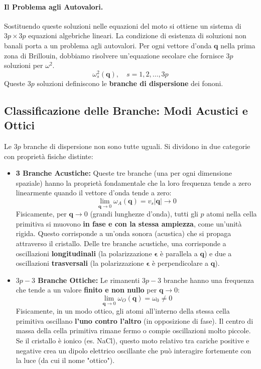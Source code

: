 \paragraph{Il Problema agli Autovalori.}
Sostituendo queste soluzioni nelle equazioni del moto si ottiene un sistema di \(3p \times 3p\) equazioni algebriche lineari. La condizione di esistenza di soluzioni non banali porta a un problema agli autovalori. Per ogni vettore d'onda \(\mathbf{q}\) nella prima zona di Brillouin, dobbiamo risolvere un'equazione secolare che fornisce \(3p\) soluzioni per \(\omega^2\).
\[ \omega^2_{s}(\mathbf{q}), \quad s=1, 2, \dots, 3p \]
Queste \(3p\) soluzioni definiscono le \textbf{branche di dispersione} dei fononi.

\subsection{Classificazione delle Branche: Modi Acustici e Ottici}
Le \(3p\) branche di dispersione non sono tutte uguali. Si dividono in due categorie con proprietà fisiche distinte:
\begin{itemize}
    \item \textbf{3 Branche Acustiche:} Queste tre branche (una per ogni dimensione spaziale) hanno la proprietà fondamentale che la loro frequenza tende a zero linearmente quando il vettore d'onda tende a zero:
    \[ \lim_{\mathbf{q} \to 0} \omega_{A}(\mathbf{q}) = v_s |\mathbf{q}| \to 0 \]
    Fisicamente, per \(\mathbf{q} \to 0\) (grandi lunghezze d'onda), tutti gli \(p\) atomi nella cella primitiva si muovono \textbf{in fase e con la stessa ampiezza}, come un'unità rigida. Questo corrisponde a un'onda sonora (acustica) che si propaga attraverso il cristallo. Delle tre branche acustiche, una corrisponde a oscillazioni \textbf{longitudinali} (la polarizzazione \(\boldsymbol{\epsilon}\) è parallela a \(\mathbf{q}\)) e due a oscillazioni \textbf{trasversali} (la polarizzazione \(\boldsymbol{\epsilon}\) è perpendicolare a \(\mathbf{q}\)).

    \item \textbf{\(3p-3\) Branche Ottiche:} Le rimanenti \(3p-3\) branche hanno una frequenza che tende a un valore \textbf{finito e non nullo} per \(\mathbf{q} \to 0\):
    \[ \lim_{\mathbf{q} \to 0} \omega_{O}(\mathbf{q}) = \omega_0 \neq 0 \]
    Fisicamente, in un modo ottico, gli atomi all'interno della stessa cella primitiva oscillano \textbf{l'uno contro l'altro} (in opposizione di fase). Il centro di massa della cella primitiva rimane fermo o compie oscillazioni molto piccole. Se il cristallo è ionico (es. NaCl), questo moto relativo tra cariche positive e negative crea un dipolo elettrico oscillante che può interagire fortemente con la luce (da cui il nome "ottico").
\end{itemize}

